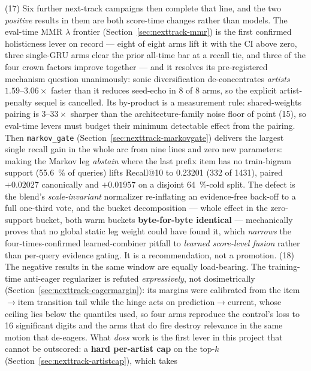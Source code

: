 \documentclass[11pt]{article}
\begin{document}
(17) Six further next-track campaigns then complete that line, and the two
\emph{positive} results in them are both score-time changes rather than models.
The eval-time MMR $\lambda$ frontier (Section~\ref{sec:nexttrack-mmr}) is the first
confirmed holisticness lever on record --- eight of eight arms lift it with the CI
above zero, three single-GRU arms clear the prior all-time bar at a recall tie, and
three of the four crown factors improve together --- and it resolves its
pre-registered mechanism question unanimously: sonic diversification
de-concentrates \emph{artists} $\numrange{1.59}{3.06}\times$ faster than it reduces
seed-echo in 8 of 8 arms, so the explicit artist-penalty sequel is cancelled. Its
by-product is a measurement rule: shared-weights pairing is
$\numrange{3}{33}\times$ sharper than the architecture-family noise floor of point
(15), so eval-time levers must budget their minimum detectable effect from the
pairing. Then \texttt{markov\_gate}
(Section~\ref{sec:nexttrack-markovgate}) delivers the largest single recall gain in
the whole arc from nine lines and zero new parameters: making the Markov leg
\emph{abstain} where the last prefix item has no train-bigram support
(\SI{55.6}{\percent} of queries) lifts Recall@10 to \num{0.23201} (\num{332} of
\num{1431}), paired $+\num{0.02027}$ canonically and $+\num{0.01957}$ on a disjoint
\SI{64}{\percent}-cold split. The defect is the blend's \emph{scale-invariant}
normalizer re-inflating an evidence-free back-off to a full one-third vote, and the
bucket decomposition --- whole effect in the zero-support bucket, both warm buckets
\textbf{byte-for-byte identical} --- mechanically proves that no global static leg
weight could have found it, which \emph{narrows} the four-times-confirmed
learned-combiner pitfall to \emph{learned score-level fusion} rather than per-query
evidence gating. It is a recommendation, not a promotion.
(18) The negative results in the same window are equally load-bearing. The
training-time anti-eager regularizer is refuted \emph{expressively}, not
dosimetrically (Section~\ref{sec:nexttrack-eagermargin}): its margins were
calibrated from the item$\to$item transition tail while the hinge acts on
prediction$\to$current, whose ceiling lies below the quantiles used, so four arms
reproduce the control's loss to \num{16} significant digits and the arms that do
fire destroy relevance in the same motion that de-eagers. What \emph{does} work is
the first lever in this project that cannot be outscored: a \textbf{hard per-artist
cap} on the top-$k$ (Section~\ref{sec:nexttrack-artistcap}), which takes
\end{document}
